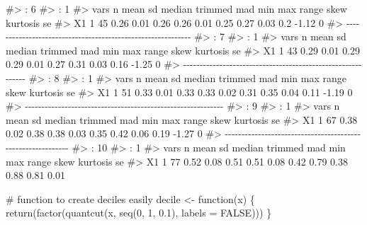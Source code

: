 \documentclass[
  10pt,
  a4paper,
]{book}
\newenvironment{Shaded}{\begin{snugshade}}{\end{snugshade}}
\newcommand{\AttributeTok}[1]{\textcolor[rgb]{0.40,0.45,0.13}{#1}}
\newcommand{\CommentTok}[1]{\textcolor[rgb]{0.37,0.37,0.37}{#1}}
\newcommand{\ConstantTok}[1]{\textcolor[rgb]{0.56,0.35,0.01}{#1}}
\newcommand{\ControlFlowTok}[1]{\textcolor[rgb]{0.00,0.46,0.62}{#1}}
\newcommand{\DecValTok}[1]{\textcolor[rgb]{0.68,0.00,0.00}{#1}}
\newcommand{\FloatTok}[1]{\textcolor[rgb]{0.68,0.00,0.00}{#1}}
\newcommand{\FunctionTok}[1]{\textcolor[rgb]{0.28,0.35,0.67}{#1}}
\newcommand{\NormalTok}[1]{\textcolor[rgb]{0.00,0.46,0.62}{#1}}
\newcommand{\OtherTok}[1]{\textcolor[rgb]{0.00,0.46,0.62}{#1}}
\begin{document}
\begin{Shaded}
\begin{Highlighting}[]
\CommentTok{\#\textgreater{} : 6}
\CommentTok{\#\textgreater{} : 1}
\CommentTok{\#\textgreater{}    vars  n mean   sd median trimmed  mad  min  max range skew kurtosis se}
\CommentTok{\#\textgreater{} X1    1 45 0.26 0.01   0.26    0.26 0.01 0.25 0.27  0.03  0.2    {-}1.12  0}
\CommentTok{\#\textgreater{} {-}{-}{-}{-}{-}{-}{-}{-}{-}{-}{-}{-}{-}{-}{-}{-}{-}{-}{-}{-}{-}{-}{-}{-}{-}{-}{-}{-}{-}{-}{-}{-}{-}{-}{-}{-}{-}{-}{-}{-}{-}{-}{-}{-}{-}{-}{-}{-}{-}{-}{-}{-}{-}{-}{-}{-}{-}{-}{-}{-} }
\CommentTok{\#\textgreater{} : 7}
\CommentTok{\#\textgreater{} : 1}
\CommentTok{\#\textgreater{}    vars  n mean   sd median trimmed  mad  min  max range skew kurtosis se}
\CommentTok{\#\textgreater{} X1    1 43 0.29 0.01   0.29    0.29 0.01 0.27 0.31  0.03 0.16    {-}1.25  0}
\CommentTok{\#\textgreater{} {-}{-}{-}{-}{-}{-}{-}{-}{-}{-}{-}{-}{-}{-}{-}{-}{-}{-}{-}{-}{-}{-}{-}{-}{-}{-}{-}{-}{-}{-}{-}{-}{-}{-}{-}{-}{-}{-}{-}{-}{-}{-}{-}{-}{-}{-}{-}{-}{-}{-}{-}{-}{-}{-}{-}{-}{-}{-}{-}{-} }
\CommentTok{\#\textgreater{} : 8}
\CommentTok{\#\textgreater{} : 1}
\CommentTok{\#\textgreater{}    vars  n mean   sd median trimmed  mad  min  max range skew kurtosis se}
\CommentTok{\#\textgreater{} X1    1 51 0.33 0.01   0.33    0.33 0.02 0.31 0.35  0.04 0.11    {-}1.19  0}
\CommentTok{\#\textgreater{} {-}{-}{-}{-}{-}{-}{-}{-}{-}{-}{-}{-}{-}{-}{-}{-}{-}{-}{-}{-}{-}{-}{-}{-}{-}{-}{-}{-}{-}{-}{-}{-}{-}{-}{-}{-}{-}{-}{-}{-}{-}{-}{-}{-}{-}{-}{-}{-}{-}{-}{-}{-}{-}{-}{-}{-}{-}{-}{-}{-} }
\CommentTok{\#\textgreater{} : 9}
\CommentTok{\#\textgreater{} : 1}
\CommentTok{\#\textgreater{}    vars  n mean   sd median trimmed  mad  min  max range skew kurtosis se}
\CommentTok{\#\textgreater{} X1    1 67 0.38 0.02   0.38    0.38 0.03 0.35 0.42  0.06 0.19    {-}1.27  0}
\CommentTok{\#\textgreater{} {-}{-}{-}{-}{-}{-}{-}{-}{-}{-}{-}{-}{-}{-}{-}{-}{-}{-}{-}{-}{-}{-}{-}{-}{-}{-}{-}{-}{-}{-}{-}{-}{-}{-}{-}{-}{-}{-}{-}{-}{-}{-}{-}{-}{-}{-}{-}{-}{-}{-}{-}{-}{-}{-}{-}{-}{-}{-}{-}{-} }
\CommentTok{\#\textgreater{} : 10}
\CommentTok{\#\textgreater{} : 1}
\CommentTok{\#\textgreater{}    vars  n mean   sd median trimmed  mad  min  max range skew kurtosis   se}
\CommentTok{\#\textgreater{} X1    1 77 0.52 0.08   0.51    0.51 0.08 0.42 0.79  0.38 0.88     0.81 0.01}

\CommentTok{\# function to create deciles easily}
\NormalTok{decile }\OtherTok{\textless{}{-}} \ControlFlowTok{function}\NormalTok{(x) \{}
  \FunctionTok{return}\NormalTok{(}\FunctionTok{factor}\NormalTok{(}\FunctionTok{quantcut}\NormalTok{(x, }\FunctionTok{seq}\NormalTok{(}\DecValTok{0}\NormalTok{, }\DecValTok{1}\NormalTok{, }\FloatTok{0.1}\NormalTok{), }\AttributeTok{labels =} \ConstantTok{FALSE}\NormalTok{)))}
\NormalTok{\}}


\end{Highlighting}
\end{Shaded}
\end{document}
